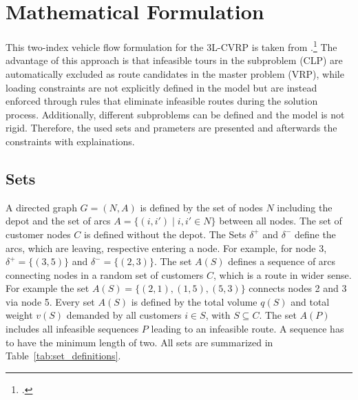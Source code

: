 \section{Mathematical Formulation}
\label{sec:mathematical_formulation}

This two-index vehicle flow formulation for the \gls{3L-CVRP} is taken from \cite{tamke_branch-and-cut_2024}.\footcite[cf.][p. 6f]{tamke_branch-and-cut_2024}
The advantage of this approach is that infeasible tours in the subproblem (\gls{CLP}) are automatically excluded as route candidates
in the master problem (\gls{VRP}), while loading constraints are not explicitly defined in the model but are instead enforced through
rules that eliminate infeasible routes during the solution process. Additionally, different subproblems can be defined and the model is
not rigid. Therefore, the used sets and prameters are presented and afterwards the constraints with explainations.

\subsection*{Sets}
A directed graph $G=(N,A)$ is defined by the set of nodes $N$ including the depot and the set of arcs
$A = \{ (i, i') \mid i, i' \in N \}$ between all nodes. The set of customer nodes $C$ is defined without the depot.
The Sets $\delta^+$ and $\delta^-$ define the arcs, which are leaving, respective entering a node.
For example, for node 3, $\delta^+ = \{(3,5)\}$ and $\delta^-= \{(2,3)\}$.
The set $A(S)$ defines a sequence of arcs connecting nodes in a random set of customers $C$,
which is a route in wider sense. For example the set $A(S)=\{(2,1),(1,5),(5,3)\}$ connects nodes
2 and 3 via node 5. Every set $A(S)$ is defined by the total volume $q(S)$ and total weight $v(S)$
demanded by all customers $i \in S$, with $S \subseteq C$. The set $A(P)$ includes all infeasible sequences $P$ leading
to an infeasible route. A sequence has to have the minimum length of two. All sets are summarized in Table~\ref{tab:set_definitions}.


